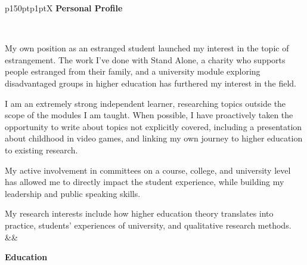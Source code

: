 \documentclass[hidelinks, 12pt, a4paper]{article}
\begin{document}
	\noindent
	\begin{table}[h!]
		\begin{tabularx}{\textwidth}{p{150pt}p{1pt}X}
			{\noindent\Large\textbf{Personal Profile}}
			
			\vspace{4pt}\
			 
			 My own position as an estranged student launched my interest in the topic of estrangement. The work I've done with Stand Alone, a charity who supports people estranged from their family, and a university module exploring disadvantaged groups in higher education has furthered my interest in the field.\newline
			 
			 I am an extremely strong independent learner, researching topics outside the scope of the modules I am taught. When possible, I have proactively taken the opportunity to write about topics not explicitly covered, including a presentation about childhood in video games, and linking my own journey to higher education to existing research.\newline
			 
			 My active involvement in committees on a course, college, and university level has allowed me to directly impact the student experience, while building my leadership and public speaking skills.\newline
			 
			 My research interests include how higher education theory translates into practice, students' experiences of university, and qualitative research methods.
			&&
			
			\begin{minipage}[t]{\linewidth}
				
				{\noindent\hspace{3pt}\Large\textbf{Education}}
				

\end{minipage}
\end{tabularx}
\end{table}
\end{document}
